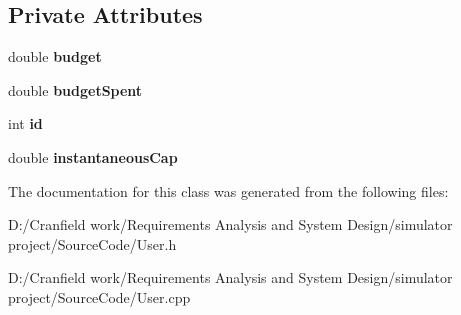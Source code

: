 \subsection*{Private Attributes}
\begin{DoxyCompactItemize}
\item 
\mbox{\label{class_user_a43dfb87a97cd57a69f2c6e56699c2148}} 
double {\bfseries budget}
\item 
\mbox{\label{class_user_a32e65c79e5f293afeaab91fa4f9e26ae}} 
double {\bfseries budget\+Spent}
\item 
\mbox{\label{class_user_aa7e6e39b43020bbe9c3a196b3689b0f7}} 
int {\bfseries id}
\item 
\mbox{\label{class_user_adf08970f798ea619121d972dde81dad3}} 
double {\bfseries instantaneous\+Cap}
\end{DoxyCompactItemize}


The documentation for this class was generated from the following files\+:\begin{DoxyCompactItemize}
\item 
D\+:/\+Cranfield work/\+Requirements Analysis and System Design/simulator project/\+Source\+Code/User.\+h\item 
D\+:/\+Cranfield work/\+Requirements Analysis and System Design/simulator project/\+Source\+Code/User.\+cpp\end{DoxyCompactItemize}
